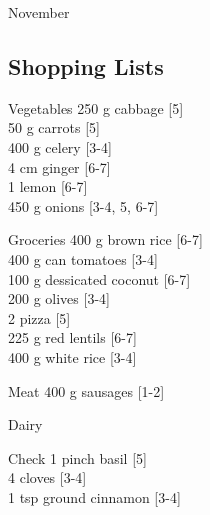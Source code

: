 \begin{menu}{November}
    \subsection*{Shopping Lists}
      \begin{shoppinglist}{Vegetables}
      250 g cabbage 
        {\scriptsize[5]}\\
      50 g carrots 
        {\scriptsize[5]}\\
      400 g celery 
        {\scriptsize[3-4]}\\
      4 cm ginger 
        {\scriptsize[6-7]}\\
      1  lemon 
        {\scriptsize[6-7]}\\
      450 g onions 
        {\scriptsize[3-4, 5, 6-7]}\\
      \end{shoppinglist}%
      \begin{shoppinglist}{Groceries}
      400 g brown rice 
        {\scriptsize[6-7]}\\
      400 g can tomatoes 
        {\scriptsize[3-4]}\\
      100 g dessicated coconut 
        {\scriptsize[6-7]}\\
      200 g olives 
        {\scriptsize[3-4]}\\
      2  pizza 
        {\scriptsize[5]}\\
      225 g red lentils 
        {\scriptsize[6-7]}\\
      400 g white rice 
        {\scriptsize[3-4]}\\
      \end{shoppinglist}%
      \par\vfil %
      \begin{shoppinglist}{Meat}
      400 g sausages 
        {\scriptsize[1-2]}\\
      \end{shoppinglist}%
      \begin{shoppinglist}{Dairy}
      \end{shoppinglist}%
      \par\vfil %
      \vfil\clearpage %
      \begin{shoppinglist}{Check}
      1 pinch basil 
        {\scriptsize[5]}\\
      4  cloves 
        {\scriptsize[3-4]}\\
      1 tsp ground cinnamon 
        {\scriptsize[3-4]}\\

\end{shoppinglist}
\end{menu}
